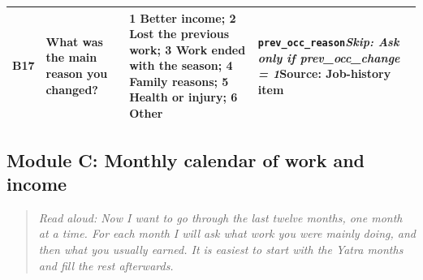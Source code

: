 \documentclass[10pt]{article}
\begin{document}
{\begin{longtable}{p{0.8cm}p{6.4cm}p{3.6cm}p{5.8cm}}
B17 & What was the main reason you changed? & 1 Better income; 2 Lost the previous work; 3 Work ended with the season; 4 Family reasons; 5 Health or injury; 6 Other & \texttt{prev\_occ\_reason}\newline \textit{Skip: Ask only if prev\_occ\_change = 1}\newline Source: Job-history item \\
\bottomrule
\end{longtable}
}
\subsection*{Module C: Monthly calendar of work and income}
\begin{quote}\small\textit{Read aloud: Now I want to go through the last twelve months, one month at a time. For each month I will ask what work you were mainly doing, and then what you usually earned. It is easiest to start with the Yatra months and fill the rest afterwards.}\end{quote}
\end{document}
